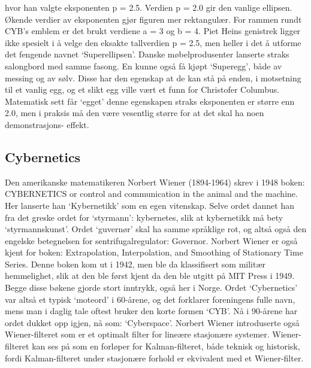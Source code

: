 \documentclass[../main.tex]{subfiles}
\begin{document}

hvor han valgte eksponenten p = 2.5. Verdien p = 2.0 gir den vanlige ellipsen. Økende verdier av eksponenten gjør figuren mer rektangulær. For rammen rundt CYB's emblem er det brukt verdiene a = 3 og b = 4. Piet Heins genistrek ligger ikke spesielt i å velge den eksakte tallverdien p = 2.5, men heller i det å utforme det fengende navnet `Superellipsen'. Danske møbelprodusenter lanserte straks salongbord med samme fasong. En kunne også få kjøpt `Superegg', både av messing og av sølv. Disse har den egenskap at de kan stå på enden, i motsetning til et vanlig egg, og et slikt egg ville vært et funn for Christofer Columbus. Matematisk sett får `egget' denne egenskapen straks eksponenten er større enn 2.0, men i praksis må den være vesentlig større for at det skal ha noen demonstrasjons- effekt.

\subsection{Cybernetics}
Den amerikanske matematikeren Norbert Wiener (1894-1964) skrev i 1948 boken: CYBERNETICS or control and communication in the animal and the machine. Her lanserte han `Kybernetikk' som en egen vitenskap. Selve ordet dannet han fra det greske ordet for `styrmann': kybernetes, slik at kybernetikk må bety `styrmannskunst'. Ordet `guvernør' skal ha samme språklige rot, og altså også den engelske betegnelsen for sentrifugalregulator: Governor. Norbert Wiener er også kjent for boken: Extrapolation, Interpolation, and Smoothing of Stationary Time Series. Denne boken kom ut i 1942, men ble da klassifisert som militær hemmelighet, slik at den ble først kjent da den ble utgitt på MIT Press i 1949. Begge disse bøkene gjorde stort inntrykk, også her i Norge. Ordet `Cybernetics' var altså et typisk `moteord' i 60-årene, og det forklarer foreningens fulle navn, mens man i daglig tale oftest bruker den korte formen `CYB'. Nå i 90-årene har ordet dukket opp igjen, nå som: `Cyberspace'. Norbert Wiener introduserte også Wiener-filteret som er et optimalt filter for lineære stasjonære systemer. Wiener-filteret kan ses på som en forløper for Kalman-filteret, både teknisk og historisk, fordi Kalman-filteret under stasjonære forhold er ekvivalent med et Wiener-filter.
\end{document}
